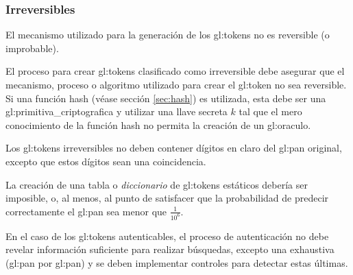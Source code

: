 %
%

\subsubsection{Irreversibles}

{
  El mecanismo utilizado para la generación de los \glspl{gl:token}
  no es reversible (o improbable).

  {
    El proceso para crear \glspl{gl:token} clasificado como irreversible
    debe asegurar que el mecanismo, proceso o algoritmo utilizado para
    crear el \gls{gl:token} no sea reversible. Si una función hash (véase
    sección \ref{sec:hash}) es utilizada, esta debe ser una
    \gls{gl:primitiva_criptografica} y utilizar una llave secreta $k$ tal que
    el mero conocimiento de la función hash no permita la creación de un
    \gls{gl:oraculo}.
  }

  {
    Los \glspl{gl:token} irreversibles no deben contener dígitos en claro del
    \gls{gl:pan} original, excepto que estos dígitos sean una coincidencia.
  }

  {
    La creación de una tabla o \textit{diccionario} de \glspl{gl:token}
    estáticos debería ser imposible, o, al menos, al punto de satisfacer que
    la probabilidad de predecir correctamente el \gls{gl:pan} sea menor que
    $\frac{1}{10^6}$.
  }

  {
    En el caso de los \glspl{gl:token} autenticables, el proceso de
    autenticación no debe revelar información suficiente para realizar
    búsquedas, excepto una exhaustiva (\gls{gl:pan} por \gls{gl:pan}) y se
    deben implementar controles para detectar estas últimas.
  }
}

